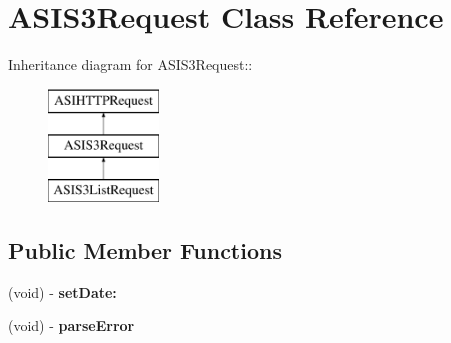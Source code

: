 \hypertarget{interface_a_s_i_s3_request}{
\section{ASIS3Request Class Reference}
\label{interface_a_s_i_s3_request}
}
Inheritance diagram for ASIS3Request::\begin{figure}[H]
\begin{center}
\leavevmode
\includegraphics[height=3cm]{interface_a_s_i_s3_request}
\end{center}
\end{figure}
\subsection*{Public Member Functions}
\begin{DoxyCompactItemize}
\item 
\hypertarget{interface_a_s_i_s3_request_a3eb32c464e0663e896f97338e45fcbcc}{
(void) -\/ {\bfseries setDate:}}
\label{interface_a_s_i_s3_request_a3eb32c464e0663e896f97338e45fcbcc}

\item 
\hypertarget{interface_a_s_i_s3_request_aa38da86baaa8d65546692c3ab8b62f59}{
(void) -\/ {\bfseries parseError}}
\label{interface_a_s_i_s3_request_aa38da86baaa8d65546692c3ab8b62f59}

\end{DoxyCompactItemize}
